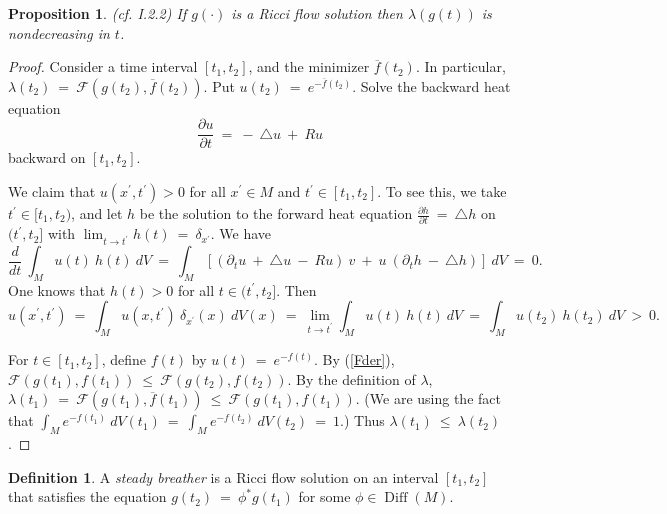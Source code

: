 \documentclass[12pt]{amsart}
\newcommand{\Diff}{\operatorname{Diff}}
\numberwithin{equation}{section}
\theoremstyle{plain}
\newtheorem{proposition}[equation]{Proposition}
\theoremstyle{definition}
\newtheorem{definition}[equation]{Definition}
\theoremstyle{remark}
\begin{document}
\begin{proposition} (cf. I.2.2) \label{mono}
If $g(\cdot)$ is a Ricci flow solution then $\lambda(g(t))$ is
nondecreasing in $t$.
\end{proposition}
\begin{proof}
Consider a time
interval $[t_1, t_2]$, and the minimizer $\overline{f}(t_2)$. In
particular, $\lambda(t_2) \: = \: {\mathcal F}(g(t_2), 
\overline{f}(t_2))$. Put $u(t_2) \: = \: e^{-\overline{f}(t_2)}$. Solve the
backward heat equation 
\begin{equation}
\frac{\partial u}{\partial t} \: = \: - \: \triangle u \: + \: Ru
\end{equation}
backward on $[t_1, t_2]$. 

We claim that
$u(x^\prime,t^\prime) > 0$ 
for all $x^\prime \in M$ and $t^\prime \in [t_1, t_2]$. To see this,
we take $t^\prime \in [t_1, t_2)$, 
and let $h$ be the solution to the forward heat equation
$\frac{\partial h}{\partial t} \: = \: \triangle h$ on $(t^\prime, t_2]$
with $\lim_{t \rightarrow t^\prime} h(t) \: = \: \delta_{x^\prime}$.
We have
\begin{equation}
\frac{d}{dt} \: \int_M u(t) \: h(t) \: dV \: = \:
\int_M \left[ (\partial_t u \: + \: \triangle u \: - \: Ru) \: v \: + \: u \:
(\partial_t h \: - \: \triangle h) \right] \: dV \: = \: 0.
\end{equation}
One knows that $h(t) > 0$ for all $t \in (t^\prime, t_2]$. Then
\begin{equation}
u(x^\prime, t^\prime) \: = \: \int_M u(x, t^\prime) \:\delta_{x^\prime}(x) \:
dV(x) \: = \: \lim_{t \rightarrow t^\prime} 
\int_M u(t) \: h(t) \:
dV \: = \:
\int_M u(t_2) \: h(t_2) \: dV \: > \: 0.
\end{equation} 

For $t \in [t_1, t_2]$, define $f(t)$ by $u(t) \: = \: e^{-f(t)}$.
By (\ref{Fder}),
$
{\mathcal F}(g(t_1), f(t_1)) \: \le \: 
{\mathcal F}(g(t_2), f(t_2))$. By the definition of
$\lambda$, $\lambda(t_1) \: = \: {\mathcal F}(g(t_1), \overline{f}(t_1)) 
\: \le \: {\mathcal F}(g(t_1), f(t_1))$. (We are using the fact that
$\int_M e^{-f(t_1)} \: dV(t_1) \: = \:
\int_M e^{-f(t_2)} \: dV(t_2) \: = \: 1$.)
Thus $\lambda(t_1) \: \le \: \lambda(t_2)$.
\end{proof}

\begin{definition}
A {\em steady breather} is a Ricci flow solution on an interval
$[t_1, t_2]$ that satisfies the equation
$g(t_2) \: = \: \phi^* g(t_1)$ for some $\phi \in \Diff(M)$.
\end{definition}
\end{document}
